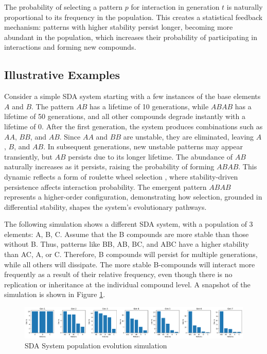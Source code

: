 \documentclass[preprint,12pt]{elsarticle}
\begin{document}
The probability of selecting a pattern $p$ for interaction in generation $t$ is naturally proportional to its frequency in the population. This creates a statistical feedback mechanism: patterns with higher stability persist longer, becoming more abundant in the population, which increases their probability of participating in interactions and forming new compounds.

\subsection{Illustrative Examples}

Consider a simple SDA system starting with a few instances of the base elements \( A \) and \( B \). The pattern \( AB \) has a lifetime of 10 generations, while \( ABAB \) has a lifetime of 50 generations, and all other compounds degrade instantly with a lifetime of 0. After the first generation, the system produces combinations such as \( AA \), \( BB \), and \( AB \). Since \( AA \) and \( BB \) are unstable, they are eliminated, leaving \( A \), \( B \), and \( AB \). In subsequent generations, new unstable patterns may appear transiently, but \( AB \) persists due to its longer lifetime. The abundance of \( AB \) naturally increases as it persists, raising the probability of forming \( ABAB \). This dynamic reflects a form of roulette wheel selection \cite{goldberg1989genetic} \cite{holland1975adaptation}, where stability-driven persistence affects interaction probability. The emergent pattern \( ABAB \) represents a higher-order configuration, demonstrating how selection, grounded in differential stability, shapes the system's evolutionary pathways. 

The following simulation shows a different SDA system, with a population of 3 elements: {A, B, C}. Assume that the B compounds are more stable than those without B. Thus, patterns like BB, AB, BC, and ABC have a higher stability than AC, A, or C. Therefore, B compounds will persist for multiple generations, while all others will dissipate. The more stable B-compounds will interact more frequently as a result of their relative frequency, even though there is no replication or inheritance at the individual compound level. A snapshot of the simulation is shown in Figure \ref{fig:figure_2}.

\begin{figure}[htp]
    \centering
    \includegraphics[width=1\textwidth]{figure_2}
    \caption{SDA System population evolution simulation}
    \label{fig:figure_2}
\end{figure}
\end{document}
